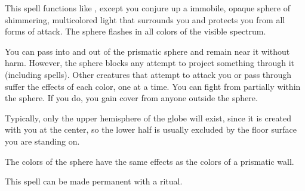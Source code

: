 \begin{spelleffect}
    This spell functions like , except you conjure up a \areasmall immobile, opaque sphere of shimmering, multicolored light that surrounds you and protects you from all forms of attack. The sphere flashes in all colors of the visible spectrum. 
    \par You can pass into and out of the prismatic sphere and remain near it without harm. However, the sphere blocks any attempt to project something through it (including spells). Other creatures that attempt to attack you or pass through suffer the effects of each color, one at a time. You can fight from partially within the sphere. If you do, you gain cover from anyone outside the sphere.
    \par Typically, only the upper hemisphere of the globe will exist, since it is created with you at the center, so the lower half is usually excluded by the floor surface you are standing on.
    \par The colors of the sphere have the same effects as the colors of a prismatic wall.
\end{spelleffect}
\begin{spellnotes}
    This spell can be made permanent with a  ritual.
\end{spellnotes}


